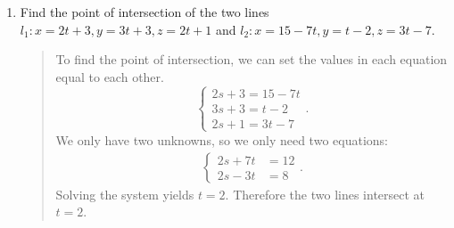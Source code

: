 \documentclass{hw}
\begin{document}
\begin{enumerate}
\item Find the point of intersection of the two lines $l_{1}: x = 2t + 3,y = 3t + 3,z = 2t + 1$ and
$l_{2}: x = 15 - 7t, y = t - 2, z = 3t - 7$.
\begin{quote}
To find the point of intersection, we can set the values in each equation equal to each other.
\[
\begin{cases}
2s + 3 = 15 - 7t\\
3s + 3 = t - 2\\
2s + 1 = 3t - 7
\end{cases}.
\]
We only have two unknowns, so we only need two equations:
\begin{align*}
\begin{cases}
2s + 7t &= 12\\
2s - 3t &= 8
\end{cases}.
\end{align*}
Solving the system yields $t = 2$. Therefore the two lines intersect at $t = 2$.
\end{quote}
\end{enumerate}
\end{document}
